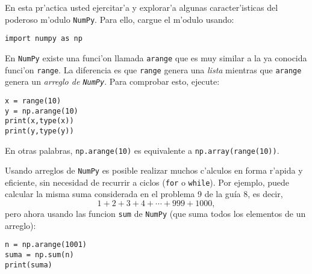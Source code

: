 \documentclass[11pt]{exam}
\begin{document}
\firstpageheadrule
\runningheadrule
{}
\cfoot{ }
\begin{flushleft}
\vspace{0.2in}
\vspace{0.25cm}
\end{flushleft}

\begin{questions}
\item En esta pr'actica usted ejercitar'a y explorar'a algunas caracter'isticas del poderoso m'odulo \texttt{NumPy}. Para ello, cargue el m'odulo usando:

\begin{verbatim}
import numpy as np
\end{verbatim}

\item En \texttt{NumPy} existe una funci'on llamada \texttt{arange} que es muy similar a la ya conocida funci'on \texttt{range}. La diferencia es que \texttt{range} genera una \textit{lista} mientras que \texttt{arange} genera un \textit{arreglo de \texttt{NumPy}}. Para comprobar esto, ejecute:

\begin{verbatim}
x = range(10)
y = np.arange(10)
print(x,type(x))
print(y,type(y))
\end{verbatim}

En otras palabras, \texttt{np.arange(10)} es equivalente a \texttt{np.array(range(10))}.

\item Usando arreglos de \texttt{NumPy} es posible realizar muchos c'alculos en forma r'apida y eficiente, sin necesidad de recurrir a ciclos (\texttt{for} o \texttt{while}). Por ejemplo, puede calcular la misma suma considerada en el problema 9 de la guía 8, es decir, 
\begin{equation}
1 + 2 + 3 + 4  + \cdots + 999 + 1000,
\end{equation}
pero ahora usando las funcion \texttt{sum} de \texttt{NumPy} (que suma todos los elementos de un arreglo):

\begin{verbatim}
n = np.arange(1001)
suma = np.sum(n)
print(suma)
\end{verbatim}


\end{questions}
\end{document}
